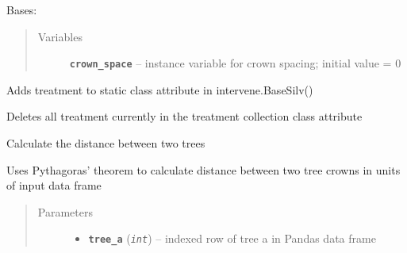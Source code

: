 \documentclass[letterpaper,10pt,english]{sphinxmanual}
\begin{document}
\begin{fulllineitems}
\label{SpaceCrowns:intervene.SpaceCrowns}
Bases: 
\begin{quote}\begin{description}
\item[{Variables}] \leavevmode
\textbf{\texttt{crown\_space}} -- instance variable for crown spacing; initial value = 0

\end{description}\end{quote}

\begin{fulllineitems}
\label{SpaceCrowns:intervene.SpaceCrowns.add_to_treatment_collection}
Adds treatment to static class attribute in intervene.BaseSilv()

\end{fulllineitems}


\begin{fulllineitems}
\label{SpaceCrowns:intervene.SpaceCrowns.clear_treatment_collection}
Deletes all treatment currently in the treatment collection class
attribute

\end{fulllineitems}


\begin{fulllineitems}
\label{SpaceCrowns:intervene.SpaceCrowns.get_distance}
Calculate the distance between two trees

Uses Pythagoras' theorem to calculate distance between two tree crowns
in units of input data frame
\begin{quote}\begin{description}
\item[{Parameters}] \leavevmode\begin{itemize}
\item {} 
\textbf{\texttt{tree\_a}} (\emph{\texttt{int}}) -- indexed row of tree a in Pandas data frame


\end{itemize}
\end{description}
\end{quote}
\end{fulllineitems}
\end{fulllineitems}
\end{document}
